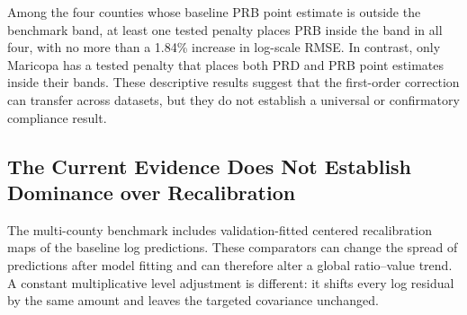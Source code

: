 \documentclass[10pt]{article}
\theoremstyle{definition}
\newcommand{\1}{\mathbf{1}}
\newcommand{\advisorchange}[1]{{\color{blue}#1}}
\begin{document}
{{\begin{table}[t]
\centering
\caption{Unpenalized LightGBM results in the six-county ATTOM benchmark. These are held-out model-benchmark point estimates, not official assessor results.}
\label{tab:attom_baselines}
\end{table}

Among the four counties whose baseline PRB point estimate is outside the benchmark band, at least one tested penalty places PRB inside the band in all four, with no more than a 1.84\% increase in log-scale RMSE. In contrast, only Maricopa has a tested penalty that places both PRD and PRB point estimates inside their bands. These descriptive results suggest that the first-order correction can transfer across datasets, but they do not establish a universal or confirmatory compliance result.

\subsection{The Current Evidence Does Not Establish Dominance over Recalibration}
\label{subsec:scaling_results}

\advisorchange{The multi-county benchmark includes validation-fitted centered recalibration maps} of the baseline log predictions. These comparators can change the spread of predictions after model fitting and can therefore alter a global ratio--value trend. A constant multiplicative level adjustment is different: it shifts every log residual by the same amount and leaves the targeted covariance unchanged.

}}
\end{document}
